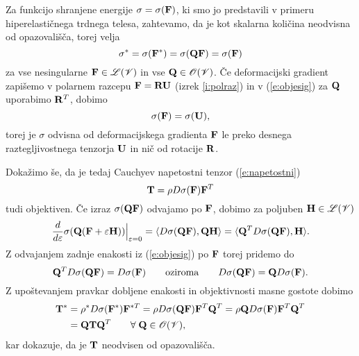 Za funkcijo shranjene energije $\sigma=\sigma(\mathbf F)$, ki smo jo predstavili v primeru
hiperelastičnega trdnega telesa, zahtevamo, da je kot skalarna količina neodvisna
od opazovališča, torej velja
\begin{equation} \label{e:objesig}
	\sigma^*=\sigma(\mathbf F^*)=\sigma(\mathbf Q\mathbf F)=\sigma(\mathbf F)
\end{equation}
za vse nesingularne $\mathbf F\in\mathscr L(\mathscr V)$ in vse $\mathbf Q\in\mathscr{O}(\mathscr V)$.
Če deformacijski gradient zapišemo v polarnem razcepu $\mathbf F=\mathbf R\mathbf U$ (izrek \ref{i:polraz})
in v (\ref{e:objesig}) za $\mathbf Q$ uporabimo $\mathbf R^T$, dobimo
\begin{equation} \label{e:siuonly}
	\sigma(\mathbf F)=\sigma(\mathbf U),
\end{equation}
torej je $\sigma$ odvisna od deformacijskega gradienta $\mathbf F$ le preko desnega
raztegljivostnega tenzorja $\mathbf U$ in nič od rotacije $\mathbf R$.

Dokažimo še, da je tedaj Cauchyev napetostni tenzor (\ref{e:napetostni})
\begin{equation} \label{e:Tdrugi}
	\mathbf T=\rho D\sigma(\mathbf F)\mathbf F^T
\end{equation}
tudi objektiven. Če izraz $\sigma(\mathbf Q\mathbf F)$ odvajamo po $\mathbf F$,
dobimo za poljuben $\mathbf H\in\mathscr L(\mathscr V)$
\[
	\frac{d}{d\varepsilon}\sigma(\mathbf Q(\mathbf F+\varepsilon\mathbf H))\Big|_{\varepsilon=0}
	=\langle D\sigma(\mathbf Q\mathbf F),\mathbf Q\mathbf H\rangle=\langle\mathbf Q^T D\sigma(\mathbf Q\mathbf F),\mathbf H\rangle.
\]
Z odvajanjem zadnje enakosti iz (\ref{e:objesig}) po $\mathbf F$ torej pridemo do
\[
	\mathbf Q^T D\sigma(\mathbf Q\mathbf F) = D\sigma(\mathbf F)\qquad\textrm{oziroma}
	\qquad D\sigma(\mathbf Q\mathbf F) = \mathbf QD\sigma(\mathbf F).
\]
Z upoštevanjem pravkar dobljene enakosti in objektivnosti masne gostote dobimo
\begin{align*}
	\mathbf T^*&=\rho^* D\sigma(\mathbf F^*)\mathbf F^{*T}
	=\rho D\sigma(\mathbf Q\mathbf F)\mathbf F^{T}\mathbf Q^{T}
	=\rho \mathbf Q D\sigma(\mathbf F)\mathbf F^{T}\mathbf Q^{T} \nonumber \\
	&=\mathbf Q\mathbf T\mathbf Q^{T}\qquad\forall\;\mathbf Q\in\mathscr{O}(\mathscr V),
\end{align*}
kar dokazuje, da je $\mathbf T$ neodvisen od opazovališča.


